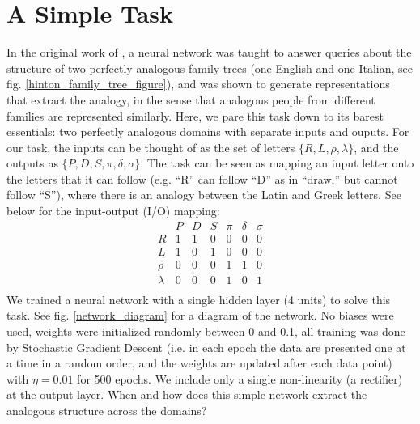 \documentclass[10pt,letterpaper]{article}
\begin{document}
\section{A Simple Task}
In the original work of \citet{Hinton1986}, a neural network was taught to answer queries about the structure of two perfectly analogous family trees (one English and one Italian, see fig. \ref{hinton_family_tree_figure}), and was shown to generate representations that extract the analogy, in the sense that analogous people from different families are represented similarly. Here, we pare this task down to its barest essentials: two perfectly analogous domains with separate inputs and ouputs. For our task, the inputs can be thought of as the set of letters \(\{R,L,\rho,\lambda\}\), and the outputs as \(\{P,D,S,\pi,\delta,\sigma\}\). The task can be seen as mapping an input letter onto the letters that it can follow (e.g. ``R'' can follow ``D'' as in ``draw,'' but cannot follow ``S''), where there is an analogy between the Latin and Greek letters. See below for the input-output (I/O) mapping: 
\[
\begin{array}{c|cccccc} 
& P & D & S & \pi & \delta & \sigma \\
\hline
R & 1 & 1 & 0 & 0 & 0 & 0 \\
L & 1 & 0 & 1 & 0 & 0 & 0 \\
\rho & 0 & 0 & 0 & 1 & 1 & 0\\
\lambda & 0 & 0 & 0 & 1 & 0 & 1\\
\end{array} 
\]
We trained a neural network with a single hidden layer (4 units) to solve this task. See fig. \ref{network_diagram} for a diagram of the network. No biases were used, weights were initialized randomly between 0 and 0.1, all training was done by Stochastic Gradient Descent (i.e. in each epoch the data are presented one at a time in a random order, and the weights are updated after each data point) with \(\eta = 0.01\) for 500 epochs. We include only a single non-linearity (a rectifier) at the output layer. When and how does this simple network extract the analogous structure across the domains? \par
\end{document}
